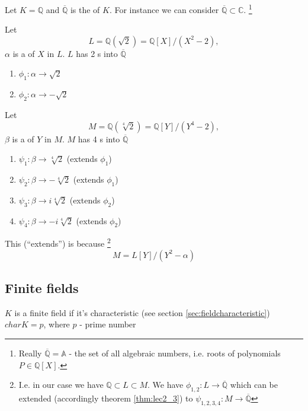 \begin{example}
  Let $K = \mathbb{Q}$ and $\overline{\mathbb{Q}}$ is the
   of $K$. For instance we can consider
  $\overline{\mathbb{Q}} \subset \mathbb{C}$.
  \footnote{
    Really $\overline{\mathbb{Q}} = \mathbb{A}$ - the set of all algebraic
    numbers, i.e. roots of polynomials $P \in
    \mathbb{Q}\left[X\right]$.
  }

  Let
  \[
  L = \mathbb{Q}\left(\sqrt{2}\right) =
  \mathbb{Q}\left[X\right]/\left(X^2 - 2\right),
  \]
  $\alpha$ is a  of $X$ in $L$. $L$ has 2
  s into 
  $\overline{\mathbb{Q}}$
  \begin{enumerate}
  \item $\phi_1: \alpha \to \sqrt{2}$
  \item $\phi_2: \alpha \to -\sqrt{2}$
  \end{enumerate}

  Let
  \[
  M = \mathbb{Q}\left(\sqrt[4]{2}\right) =
  \mathbb{Q}\left[Y\right]/\left(Y^4 - 2\right),
  \]
  $\beta$ is a  of $Y$ in $M$. $M$ has 4
  s into 
  $\overline{\mathbb{Q}}$
  \begin{enumerate}
  \item $\psi_1: \beta \to \sqrt[4]{2}$ (extends $\phi_1$)
  \item $\psi_2: \beta \to -\sqrt[4]{2}$ (extends $\phi_1$)
  \item $\psi_3: \beta \to i\sqrt[4]{2}$ (extends $\phi_2$)
  \item $\psi_4: \beta \to -i\sqrt[4]{2}$ (extends $\phi_2$)
  \end{enumerate}
  This (``extends'') is because
  \footnote{
    I.e. in our case we have $\mathbb{Q} \subset L \subset M$. We have
    $\phi_{1,2} : L \to \overline{\mathbb{Q}}$ which can be extended
    (accordingly theorem \ref{thm:lec2_3}) to
    $\psi_{1,2,3,4} : M \to \overline{\mathbb{Q}}$
  }
  \[
  M = L\left[Y\right]/\left(Y^2 - \alpha\right) 
  \]
  \label{ex:homomorphismext}
\end{example}

\subsection{Finite fields}

\begin{definition}
  $K$ is a finite field if it's characteristic (see section
  \ref{sec:fieldcharacteristic}) $char K = p$, where $p$ 
  - prime number 
  \label{def:finitefield}
\end{definition}

